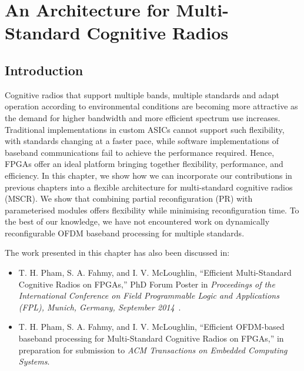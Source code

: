 \chapter{An Architecture for Multi-Standard Cognitive Radios}
\label{chap:MSCR}
\section{Introduction}
Cognitive radios that support multiple bands, multiple standards and adapt operation according to environmental conditions are becoming more attractive as the demand for higher bandwidth and more efficient spectrum use increases.
Traditional implementations in custom ASICs cannot support such flexibility, with standards changing at a faster pace, while software implementations of baseband communications fail to achieve the performance required.
Hence, FPGAs offer an ideal platform bringing together flexibility, performance, and efficiency.
In this chapter, we show how we can incorporate our contributions in previous chapters into a flexible architecture for multi-standard cognitive radios (MSCR).
We show that combining partial reconfiguration (PR) with parameterised  modules offers flexibility while minimising reconfiguration time.
To the best of our knowledge, we have not encountered work on dynamically reconfigurable OFDM baseband processing for multiple standards.

The work presented in this chapter has also been discussed in:
\begin{itemize}
\item T. H. Pham, S. A. Fahmy, and I. V. McLoughlin, ``Efficient Multi-Standard Cognitive Radios on FPGAs,'' PhD Forum Poster in \textit{Proceedings of the International Conference on Field Programmable Logic and Applications (FPL), Munich, Germany, September 2014}~\cite{Pham2014a}.
\item T. H. Pham, S. A. Fahmy, and I. V. McLoughlin, ``Efficient OFDM-based baseband processing for Multi-Standard Cognitive Radios on FPGAs,'' in preparation for submission to \emph{ACM Transactions on Embedded Computing Systems}.
\end{itemize}

